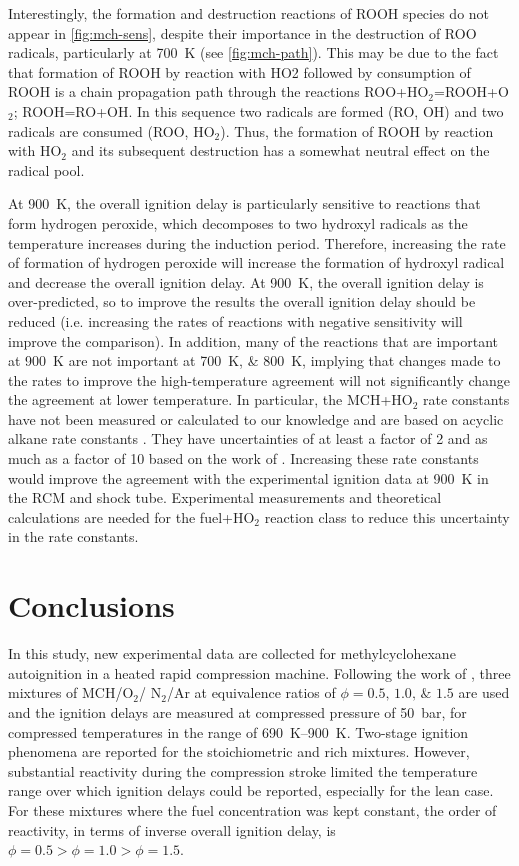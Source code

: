 \documentclass[../main.tex]{subfiles}
\begin{document}
Interestingly, the formation and destruction reactions of ROOH species
do not appear in \cref{fig:mch-sens}, despite their importance in
the destruction of ROO radicals, particularly at \SI{700}{\kelvin}
(see \cref{fig:mch-path}). This may be due to the fact that
formation of ROOH by reaction with HO2 followed by consumption of ROOH
is a chain propagation path through the reactions ROO+HO$_2$=ROOH+O$_2$;
ROOH=RO+OH. In this sequence two radicals are formed (RO, OH) and two
radicals are consumed (ROO, HO$_2$). Thus, the formation of ROOH by
reaction with HO$_2$ and its subsequent destruction has a somewhat
neutral effect on the radical pool.

At \SI{900}{\kelvin}, the overall ignition delay is particularly sensitive
to reactions that form hydrogen peroxide, which decomposes to two
hydroxyl radicals as the temperature increases during the induction
period. Therefore, increasing the rate of formation of hydrogen peroxide
will increase the formation of hydroxyl radical and decrease the overall
ignition delay. At \SI{900}{\kelvin}, the overall ignition delay is
over-predicted, so to improve the results the overall ignition delay
should be reduced (i.e. increasing the rates of reactions with negative
sensitivity will improve the comparison). In addition, many of the
reactions that are important at \SI{900}{\kelvin} are not important at
\SIlist{700;800}{\kelvin}, implying that changes made to the rates to
improve the high-temperature agreement will not significantly change the
agreement at lower temperature. In particular, the MCH+HO$_2$ rate constants
have not been measured or calculated to our knowledge and are based
on acyclic alkane rate constants \cite{Aguilera-Iparraguirre2008}. They have uncertainties of at
least a factor of 2 and as much as a factor of 10 based on the work
of \textcite{Aguilera-Iparraguirre2008}. Increasing these rate constants
would improve the agreement with the experimental ignition data at
\SI{900}{\kelvin} in the RCM and shock tube. Experimental measurements
and theoretical calculations are needed for the fuel+HO$_2$ reaction class to
reduce this uncertainty in the rate constants.

\section{Conclusions}

In this study, new experimental data are collected for methylcyclohexane
autoignition in a heated rapid compression machine. Following the work
of \textcite{Mittal2009}, three mixtures of MCH/O$_2$/ N$_2$/Ar at equivalence
ratios of $\phi=\numlist{0.5;1.0;1.5}$ are used and the ignition delays
are measured at compressed pressure of \SI{50}{\bar}, for compressed
temperatures in the range of \SIrange{690}{900}{\kelvin}. Two-stage
ignition phenomena are reported for the stoichiometric and rich
mixtures. However, substantial reactivity during the compression
stroke limited the temperature range over which ignition delays could
be reported, especially for the lean case. For these mixtures where the
fuel concentration was kept constant, the order of reactivity, in terms
of inverse overall ignition delay, is $\phi=\num{0.5}>\phi=\num{1.0}>\phi=\num{1.5}$.
\end{document}

